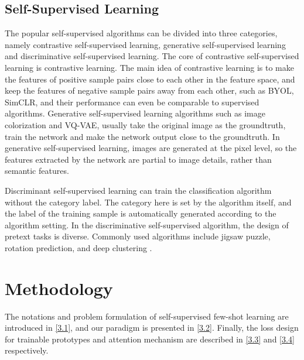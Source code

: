 \documentclass[conference]{IEEEtran}
\begin{document}
\subsection{Self-Supervised Learning}
The popular self-supervised algorithms can be divided into three categories, namely contrastive self-supervised learning, generative self-supervised learning and discriminative self-supervised learning. The core of contrastive self-supervised learning is contrastive learning. The main idea of contrastive learning is to make the features of positive sample pairs close to each other in the feature space, and keep the features of negative sample pairs away from each other, such as BYOL\cite{grill2020bootstrap}, SimCLR\cite{chen2020simple}, and their performance can even be comparable to supervised algorithms. Generative self-supervised learning algorithms such as image colorization\cite{zhang2016colorful} and VQ-VAE\cite{oord2017neural}, usually take the original image as the groundtruth, train the network and make the network output close to the groundtruth. In generative self-supervised learning, images are generated at the pixel level, so the features extracted by the network are partial to image details, rather than semantic features. 

Discriminant self-supervised learning can train the classification algorithm without the category label. The category here is set by the algorithm itself, and the label of the training sample is automatically generated according to the algorithm setting. In the discriminative self-supervised algorithm, the design of pretext tasks is diverse. Commonly used algorithms include jigsaw puzzle\cite{noroozi2016unsupervised}, 
rotation prediction\cite{gidaris2018unsupervised}, and deep clustering \cite{tian2017deepcluster}.



\section{Methodology}\label{Section 3}
The notations and problem formulation of self-supervised few-shot learning are introduced in \ref{3.1}, and our paradigm is presented in \ref{3.2}. Finally, the loss design for trainable prototypes and attention mechanism are described in \ref{3.3} and \ref{3.4} respectively. 
\end{document}
